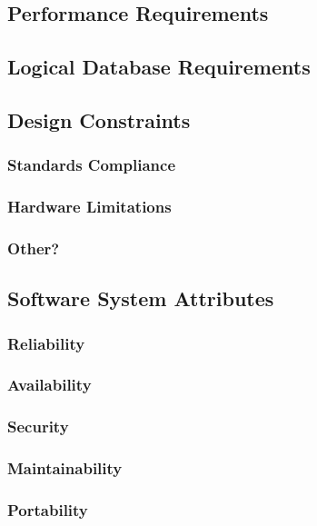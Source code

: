 \subsection{Performance Requirements}

\subsection{Logical Database Requirements}

\subsection{Design Constraints}

\subsubsection{Standards Compliance}
\subsubsection{Hardware Limitations}
\subsubsection{Other?}

\subsection{Software System Attributes}

\subsubsection{Reliability}
\subsubsection{Availability}
\subsubsection{Security}
\subsubsection{Maintainability}
\subsubsection{Portability}





